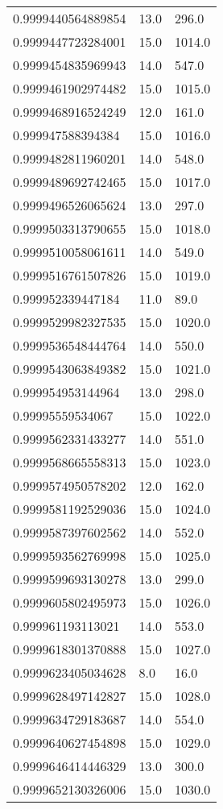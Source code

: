 \begin{center}
\begin{supertabular}[H]{p{0.30\textwidth}p{0.05\textwidth}p{0.05\textwidth}}
0.9999440564889854 & 13.0 & 296.0 \\ 
0.9999447723284001 & 15.0 & 1014.0 \\ 
0.9999454835969943 & 14.0 & 547.0 \\ 
0.9999461902974482 & 15.0 & 1015.0 \\ 
0.9999468916524249 & 12.0 & 161.0 \\ 
0.999947588394384 & 15.0 & 1016.0 \\ 
0.9999482811960201 & 14.0 & 548.0 \\ 
0.9999489692742465 & 15.0 & 1017.0 \\ 
0.9999496526065624 & 13.0 & 297.0 \\ 
0.9999503313790655 & 15.0 & 1018.0 \\ 
0.9999510058061611 & 14.0 & 549.0 \\ 
0.9999516761507826 & 15.0 & 1019.0 \\ 
0.999952339447184 & 11.0 & 89.0 \\ 
0.9999529982327535 & 15.0 & 1020.0 \\ 
0.9999536548444764 & 14.0 & 550.0 \\ 
0.9999543063849382 & 15.0 & 1021.0 \\ 
0.999954953144964 & 13.0 & 298.0 \\ 
0.99995559534067 & 15.0 & 1022.0 \\ 
0.9999562331433277 & 14.0 & 551.0 \\ 
0.9999568665558313 & 15.0 & 1023.0 \\ 
0.9999574950578202 & 12.0 & 162.0 \\ 
0.9999581192529036 & 15.0 & 1024.0 \\ 
0.9999587397602562 & 14.0 & 552.0 \\ 
0.9999593562769998 & 15.0 & 1025.0 \\ 
0.9999599693130278 & 13.0 & 299.0 \\ 
0.9999605802495973 & 15.0 & 1026.0 \\ 
0.999961193113021 & 14.0 & 553.0 \\ 
0.9999618301370888 & 15.0 & 1027.0 \\ 
0.9999623405034628 & 8.0 & 16.0 \\ 
0.9999628497142827 & 15.0 & 1028.0 \\ 
0.9999634729183687 & 14.0 & 554.0 \\ 
0.9999640627454898 & 15.0 & 1029.0 \\ 
0.9999646414446329 & 13.0 & 300.0 \\ 
0.9999652130326006 & 15.0 & 1030.0 \\ 

\end{supertabular}
\end{center}

